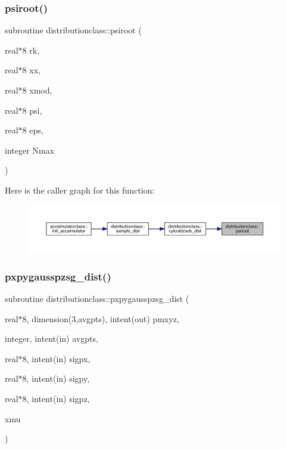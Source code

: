 \subsubsection{\texorpdfstring{psiroot()}{psiroot()}}
{\footnotesize\ttfamily subroutine distributionclass\+::psiroot (\begin{DoxyParamCaption}\item[{real$\ast$8}]{rk,  }\item[{real$\ast$8}]{xx,  }\item[{real$\ast$8}]{xmod,  }\item[{real$\ast$8}]{psi,  }\item[{real$\ast$8}]{eps,  }\item[{integer}]{Nmax }\end{DoxyParamCaption})}

Here is the caller graph for this function\+:\nopagebreak
\begin{figure}[H]
\begin{center}
\leavevmode
\includegraphics[width=350pt]{namespacedistributionclass_a714922ece09780473330b901fa566f71_icgraph}
\end{center}
\end{figure}
\mbox{\label{namespacedistributionclass_ab6dde242aa247f41d9581455e84607fb}} 
\subsubsection{\texorpdfstring{pxpygausspzsg\_dist()}{pxpygausspzsg\_dist()}}
{\footnotesize\ttfamily subroutine distributionclass\+::pxpygausspzsg\+\_\+dist (\begin{DoxyParamCaption}\item[{real$\ast$8, dimension(3,avgpts), intent(out)}]{pmxyz,  }\item[{integer, intent(in)}]{avgpts,  }\item[{real$\ast$8, intent(in)}]{sigpx,  }\item[{real$\ast$8, intent(in)}]{sigpy,  }\item[{real$\ast$8, intent(in)}]{sigpz,  }\item[{}]{xmu }\end{DoxyParamCaption})}



